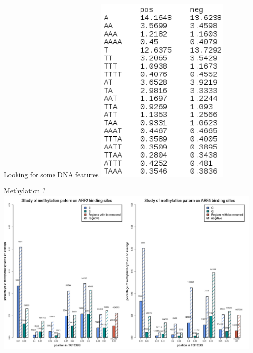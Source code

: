 \documentclass{beamer}
\begin{document}
\begin{frame}{Looking for some DNA features}
  \includegraphics[width=0.5\textwidth,height=0.6\textheight,center]{A_and_T_rate.png}
\end{frame}

\begin{frame}{Methylation ? }
  \includegraphics[width=1\textwidth,height=0.90\textheight,center]{ARF2_ARF5_methylation_and_sample_sizes_v3.png}
\end{frame}
\end{document}
